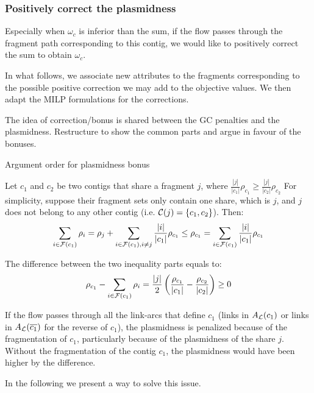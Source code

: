 \subsubsection{Positively correct the plasmidness}\label{sec:pbf_iterbin:decomp:mps:fine_tuned}

Especially when \(\omega_c\) is inferior than the sum, if the flow passes through the fragment path corresponding to this contig, we would like to positively correct the sum to obtain \(\omega_c\).

In what follows, we associate new attributes to the fragments corresponding to the possible positive correction we may add to the objective values.
We then adapt the MILP formulations for the corrections.

\begin{refactorbox}
  The idea of correction/bonus is shared between the GC penalties and the plasmidness.
  Restructure to show the common parts and argue in favour of the bonuses.
\end{refactorbox}

\begin{fixmebox}
  Argument order for plasmidness bonus
\end{fixmebox}

Let \(c_1\) and \(c_2\) be two contigs that share a fragment \(j\), where \(\frac{ |j| }{ |c_1| } \rho_{c_1} \geq \frac{ |j| }{ |c_2| } \rho_{c_2}\)
For simplicity, suppose their fragment sets only contain one share, which is \(j\), and \(j\) does not belong to any other contig (i.e. \(\mathcal{C}(j) = \{c_1, c_2\} \)).
Then:
\[
  \sum_{i \in \mathcal{F}{}(c_1) } \rho_{i} = \rho_{j} + \sum_{i \in \mathcal{F}{}(c_1), i \neq j} \frac{ |i| }{ |c_1| } \rho_{c_1} \leq \rho_{c_1} = \sum_{i \in \mathcal{F}{}(c_1) } \frac{ |i| }{ |c_1| } \rho_{c_1}
\]

The difference between the two inequality parts equals to:
\[
  \rho_{c_1} - \sum_{i \in \mathcal{F}{}(c_1) } \rho_{i} = \frac{ |j| }{2} \left(\frac{ \rho_{c_1} }{ |c_1| } - \frac{ \rho_{c_2} }{ |c_2| } \right) \geq 0
\]

If the flow passes through all the link-arcs that define \(c_1\) (links in \(A_{\mathcal{L}}{}(c_1)\) or links in \(A_{\mathcal{L}}{}(\overline{c_1})\) for the reverse of \(c_1\)), the plasmidness is penalized because of the fragmentation of \(c_1\), particularly because of the plasmidness of the share \(j\).
Without the fragmentation of the contig \(c_1\), the plasmidness would have been higher by the difference.

In the following we present a way to solve this issue.

